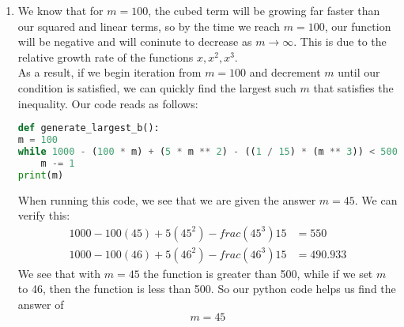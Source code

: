 \documentclass[12pt, letterpaper]{article}
\begin{document}
\begin{enumerate}[label=(\alph*)]
    \item We know that for $m = 100$, the cubed term will be growing far faster than our squared and linear 
        terms, so by the time we reach $m = 100$, our function will be negative and will coninute to decrease as $m\rightarrow \infty$.
        This is due to the relative growth rate of the functions $x, x^2, x^3$. \\
        As a result, if we begin iteration from $m = 100$ and decrement $m$ until our condition is satisfied,
        we can quickly find the largest such $m$ that satisfies the inequality. Our code reads as follows:
\begin{lstlisting}[language = Python]
def generate_largest_b():
m = 100
while 1000 - (100 * m) + (5 * m ** 2) - ((1 / 15) * (m ** 3)) < 500:
    m -= 1
print(m)
\end{lstlisting}
    When running this code, we see that we are given the answer $m = 45$. We can verify this:
    \begin{align*} 
        1000 - 100(45) + 5(45^2) -frac{(45^3)}{15} &= 550 \\
        1000 - 100(46) + 5(46^2) -frac{(46^3)}{15} &= 490.933 
    \end{align*}
    We see that with $m=45$ the function is greater than 500, while if we set $m$ to 46, 
    then the function is less than 500. So our python code helps us find the answer of 
    \[
        m = 45    
    \]
\end{enumerate}
\end{document}
